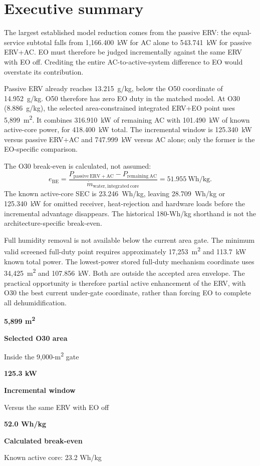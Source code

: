 \documentclass[10pt,a4paper]{article}
\newcommand{\sans}{\fontfamily{qhv}\selectfont}
\newcommand{\metric}[3]{\begin{minipage}[t]{0.30\textwidth}{\sans\bfseries\fontsize{18}{20}\selectfont\color{Navy}#1}\par{\sans\bfseries\small #2}\par{\scriptsize\color{Slate}#3}\end{minipage}}
\begin{document}
\clearpage
\section*{Executive summary}

The largest established model reduction comes from the passive ERV: the
equal-service subtotal falls from 1,166.400~kW for AC alone to 543.741~kW for
passive ERV+AC. EO must therefore be judged incrementally against the same ERV
with EO off. Crediting the entire AC-to-active-system difference to EO would
overstate its contribution.

Passive ERV already reaches 13.215~g/kg, below the O50 coordinate of
14.952~g/kg. O50 therefore has zero EO duty in the matched model. At O30
(8.886~g/kg), the selected area-constrained integrated ERV+EO point uses
5,899~m\textsuperscript{2}. It combines 316.910~kW of remaining AC with
101.490~kW of known active-core power, for 418.400~kW total. The incremental
window is 125.340~kW versus passive ERV+AC and 747.999~kW versus AC alone; only
the former is the EO-specific comparison.

The O30 break-even is calculated, not assumed:
\[
e_{\mathrm{BE}}=
\frac{P_{\mathrm{passive\ ERV+AC}}-P_{\mathrm{remaining\ AC}}}
{\dot m_{\mathrm{water,integrated\ core}}}
=51.955~\mathrm{Wh/kg}.
\]
The known active-core SEC is 23.246~Wh/kg, leaving 28.709~Wh/kg or 125.340~kW
for omitted receiver, heat-rejection and hardware loads before the incremental
advantage disappears. The historical 180-Wh/kg shorthand is not the
architecture-specific break-even.

Full humidity removal is not available below the current area gate. The
minimum valid screened full-duty point requires approximately
17,253~m\textsuperscript{2} and 113.7~kW known total power. The lowest-power
stored full-duty mechanism coordinate uses 34,425~m\textsuperscript{2} and
107.856~kW. Both are outside the accepted area envelope. The practical
opportunity is therefore partial active enhancement of the ERV, with O30 the
best current under-gate coordinate, rather than forcing EO to complete all
dehumidification.

\begin{center}
\metric{5,899 m\textsuperscript{2}}{Selected O30 area}{Inside the 9,000-m\textsuperscript{2} gate}\hfill
\metric{125.3 kW}{Incremental window}{Versus the same ERV with EO off}\hfill
\metric{52.0 Wh/kg}{Calculated break-even}{Known active core: 23.2 Wh/kg}
\end{center}
\end{document}
